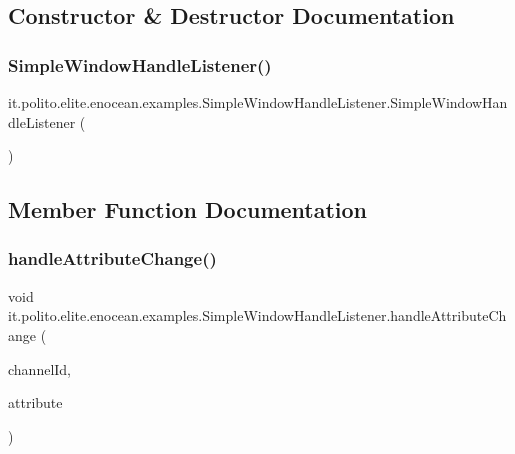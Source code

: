 \subsection{Constructor \& Destructor Documentation}
\hypertarget{classit_1_1polito_1_1elite_1_1enocean_1_1examples_1_1_simple_window_handle_listener_a0729c3be0ddc941da604e49bd8d75ff4}{}\label{classit_1_1polito_1_1elite_1_1enocean_1_1examples_1_1_simple_window_handle_listener_a0729c3be0ddc941da604e49bd8d75ff4} 
\subsubsection{\texorpdfstring{Simple\+Window\+Handle\+Listener()}{SimpleWindowHandleListener()}}
{\footnotesize\ttfamily it.\+polito.\+elite.\+enocean.\+examples.\+Simple\+Window\+Handle\+Listener.\+Simple\+Window\+Handle\+Listener (\begin{DoxyParamCaption}{ }\end{DoxyParamCaption})}



\subsection{Member Function Documentation}
\hypertarget{classit_1_1polito_1_1elite_1_1enocean_1_1examples_1_1_simple_window_handle_listener_a39176a5ebe41a14b797c532232dfb7fe}{}\label{classit_1_1polito_1_1elite_1_1enocean_1_1examples_1_1_simple_window_handle_listener_a39176a5ebe41a14b797c532232dfb7fe} 
\subsubsection{\texorpdfstring{handle\+Attribute\+Change()}{handleAttributeChange()}}
{\footnotesize\ttfamily void it.\+polito.\+elite.\+enocean.\+examples.\+Simple\+Window\+Handle\+Listener.\+handle\+Attribute\+Change (\begin{DoxyParamCaption}\item[{int}]{channel\+Id,  }\item[{\hyperlink{classit_1_1polito_1_1elite_1_1enocean_1_1enj_1_1eep_1_1_e_e_p_attribute}{E\+E\+P\+Attribute}$<$?$>$}]{attribute }\end{DoxyParamCaption})}

